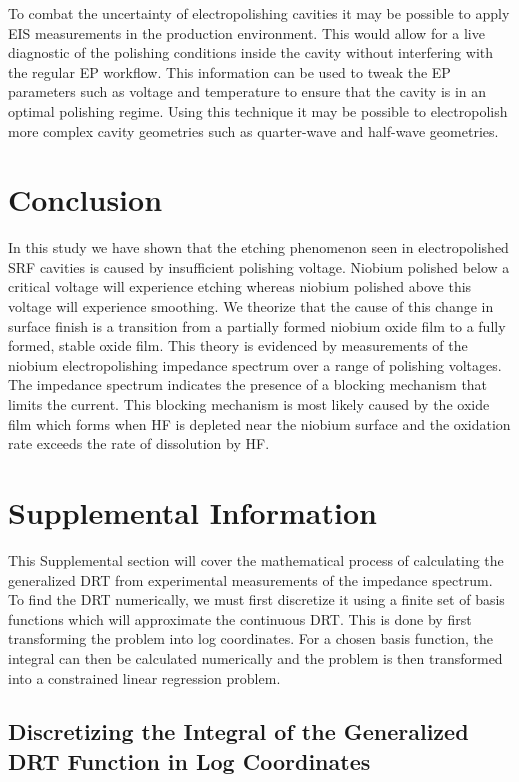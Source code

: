 To combat the uncertainty of electropolishing cavities it may be possible to apply EIS measurements in the production environment. This would allow for a live diagnostic of the polishing conditions inside the cavity without interfering with the regular EP workflow. This information can be used to tweak the EP parameters such as voltage and temperature to ensure that the cavity is in an optimal polishing regime. Using this technique it may be possible to electropolish more complex cavity geometries such as quarter-wave and half-wave geometries.



\section{Conclusion}
\label{sec:org57282ed}
In this study we have shown that the etching phenomenon seen in electropolished SRF cavities is caused by insufficient polishing voltage. Niobium polished below a critical voltage will experience etching whereas niobium polished above this voltage will experience smoothing. We theorize that the cause of this change in surface finish is a transition from a partially formed niobium oxide film to a fully formed, stable oxide film. This theory is evidenced by measurements of the niobium electropolishing impedance spectrum over a range of polishing voltages. The impedance spectrum indicates the presence of a blocking mechanism that limits the current. This blocking mechanism is most likely caused by the oxide film which forms when HF is depleted near the niobium surface and the oxidation rate exceeds the rate of dissolution by HF.


\section{Supplemental Information}
\label{sec:sup}

This Supplemental section will cover the mathematical process of calculating the generalized DRT from experimental measurements of the impedance spectrum. To find the DRT numerically, we must first discretize it using a finite set of basis functions which will approximate the continuous DRT. This is done by first transforming the problem into log coordinates. For a chosen basis function, the integral can then be calculated numerically and the problem is then transformed into a constrained linear regression problem.

\subsection{Discretizing the Integral of the Generalized DRT Function in Log Coordinates}

